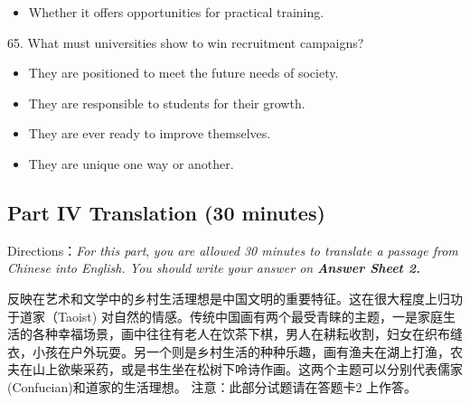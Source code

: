 \documentclass[UTF8,11pt]{ctexart}
\begin{document}
\begin{itemize}[leftmargin=2em,itemsep=.2em,topsep=.4em]\item[D.] Whether it offers opportunities for practical training.
\end{itemize}

65. What must universities show to win recruitment campaigns?


\begin{itemize}[leftmargin=2em,itemsep=.2em,topsep=.4em]\item[A.] They are positioned to meet the future needs of society.
\item[B.] They are responsible to students for their growth.
\item[C.] They are ever ready to improve themselves.
\item[D.] They are unique one way or another.
\end{itemize}

\subsection*{\textbf{Part} IV \textbf{Translation} \textbf{(30 minutes)}}


Directions：\textit{For this part},\textit{ you are allowed 30 minutes to translate a passage from Chinese into English. You should write} \textit{your answer on}\textbf{\textit{ Answer Sheet 2.}}


反映在艺术和文学中的乡村生活理想是中国文明的重要特征。这在很大程度上归功于道家（Taoist) 对自然的情感。传统中国画有两个最受青睐的主题，一是家庭生活的各种幸福场景，画中往往有老人在饮茶下棋，男人在耕耘收割，妇女在织布缝衣，小孩在户外玩耍。另一个则是乡村生活的种种乐趣，画有渔夫在湖上打渔，农夫在山上欲柴采药，或是书生坐在松树下呤诗作画。这两个主题可以分别代表儒家(Confucian)和道家的生活理想。 注意：此部分试题请在答题卡2 上作答。
\end{document}
